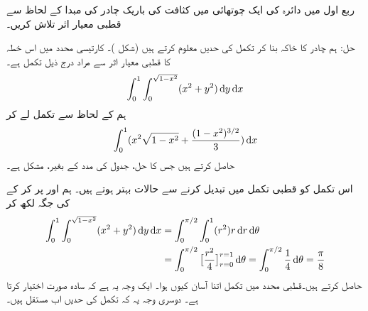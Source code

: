 ربع اول میں دائرہ  کی ایک چوتھائی   میں کثافت  کی باریک چادر کی مبدا کے لحاظ سے  قطبی  معیار اثر تلاش کریں۔

حل:\quad
ہم چادر  کا خاکہ بنا کر تکمل کی حدیں معلوم کرتے ہیں (شکل )۔ کارتیسی محدد میں اس خطہ  کا قطبی معیار اثر سے مراد درج ذیل تکمل ہے۔
\begin{align*}
\int_0^1\int_0^{\sqrt{1-x^2}}(x^2+y^2)\dif y\dif x
\end{align*}
ہم   کے لحاظ سے تکمل لے  کر
\begin{align*}
\int_0^1 (x^2\sqrt{1-x^2}+\frac{(1-x^2)^{3/2}}{3})\dif x
\end{align*}
حاصل کرتے ہیں جس کا حل، جدول کی مدد کے بغیر، مشکل ہے۔

 اس تکمل کو قطبی تکمل میں تبدیل کرنے  سے  حالات بہتر ہوتے ہیں۔ ہم  اور   پر کر کے  کی جگہ  لکھ کر
\begin{align*}
\int_0^1\int_0^{\sqrt{1-x^2}}(x^2+y^2)\dif y\dif x&=\int_0^{\pi/2}\int_0^{1} (r^2)r\dif r\dif \theta\\
&=\int_0^{\pi/2}\big[\frac{r^2}{4}\big]_{r=0}^{r=1}\dif\theta=\int_{0}^{\pi/2}\frac{1}{4}\dif\theta=\frac{\pi}{8}
\end{align*}
حاصل کرتے ہیں۔قطبی محدد میں تکمل اتنا آسان کیوں ہوا۔ ایک وجہ یہ ہے کہ   سادہ صورت  اختیار کرتا ہے۔ دوسری وجہ یہ کہ تکمل کی حدیں اب مستقل ہیں۔

